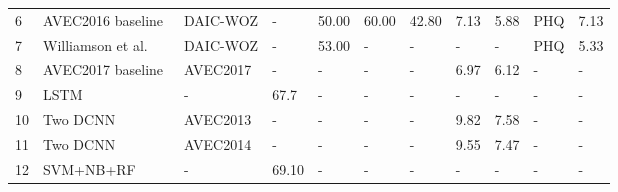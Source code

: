 \begin{table*}
\begin{tabular}{l|l|l|llll|ll|ll}
6                                       & AVEC2016 baseline~\cite{valstar2016avec}                                                                                     & DAIC-WOZ                                     & -        & 50.00      & 60.00     & 42.80  & 7.13                     & 5.88                    & PHQ       & 7.13               \\
7                                       & Williamson et al.~\cite{2016Detecting}                                                                         & DAIC-WOZ                                     & -        & 53.00      & -         & -      & -                        & -                       & PHQ       & 5.33               \\
8                                       & AVEC2017 baseline~\cite{ringeval2017avec}                                                                      & AVEC2017                                     & -        & -          & -         & -      & 6.97                     & 6.12                    & -         & -                  \\
9                                      & LSTM~\cite{ 2017Exploring}                                                                                     & -                                            & 67.7     & -          & -         & -      & -                        & -                       & -         & -                  \\
10                                      & Two DCNN~\cite{2017Automated}                                                                                  & AVEC2013                                     & -        & -          & -         & -      & 9.82                     & 7.58                    & -         & -                  \\
11                                      & Two DCNN~\cite{2017Automated}                                                                                  & AVEC2014                                     & -        & -          & -         & -      & 9.55                     & 7.47                    & -         & -                  \\
12                                      & SVM+NB+RF~\cite{2018A}                                                                                         & -                                            & 69.10    & -          & -         & -      & -                        & -                       & -         & -                  \\

\end{tabular}
\end{table*}
